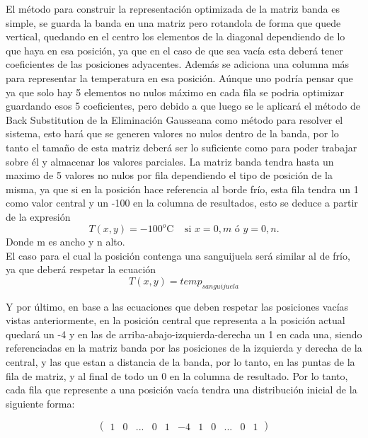 El método para construir la representación optimizada de la matriz banda es simple, se guarda la banda en una matriz pero rotandola de forma que quede vertical, quedando en el centro los elementos de la diagonal dependiendo de lo que haya en esa posición, ya que en el caso de que sea vacía esta deberá tener coeficientes de las posiciones adyacentes. Además se adiciona una columna más para representar la temperatura en esa posición.
Aúnque uno podría pensar que ya que solo hay 5 elementos no nulos máximo en cada fila se podria optimizar guardando esos 5 coeficientes, pero debido a que luego se le aplicará el método de Back Substitution de la Eliminación Gausseana como método para resolver el sistema, esto hará que se generen valores no nulos dentro de la banda, por lo tanto el tamaño de esta matriz deberá ser lo suficiente como para poder trabajar sobre él y almacenar los valores parciales.
La matriz banda tendra hasta un maximo de 5 valores no nulos por fila dependiendo el tipo de posición de la misma, ya que si en la posición hace referencia al borde frío, esta fila tendra un 1 como valor central y un -100 en la columna de resultados, esto se deduce a partir de la expresión 
\begin{equation}
T(x,y) = -100^o\textrm{C}~~~~~\textrm{si } x = 0,m \textrm{ \'o } y = 0,n. 
\label{eq:borde}
\end{equation}
Donde m es ancho y n alto.\\
 El caso para el cual la posición contenga una sanguijuela será similar al de frío, ya que deberá respetar la ecuación
 \begin{equation}
T(x,y) = temp_{sanguijuela}
\label{eq:borde}
\end{equation}

Y por último, en base a las ecuaciones que deben respetar las posiciones vacías vistas anteriormente, en la posición central que representa a la posición actual quedará un -4 y en las de arriba-abajo-izquierda-derecha un 1 en cada una, siendo referenciadas en la matriz banda por las posiciones de la izquierda y derecha de la central, y las que estan a distancia de la banda, por lo tanto, en las puntas de la fila de matriz, y al final de todo un 0 en la columna de resultado. Por lo tanto, cada fila que represente a una posición vacía tendra una distribución inicial de la siguiente forma:


\[ \left( \begin{array}{ccccccccccc}
1 & 0 & ... & 0 & 1 & -4 & 1 & 0  & ... & 0 & 1\end{array} 
\right)\] 

